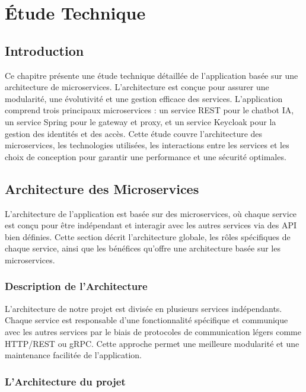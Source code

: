 \documentclass[a4paper, 11pt, openany]{report}
\begin{document}
\chapter{Étude Technique}

\section{Introduction}
Ce chapitre présente une étude technique détaillée de l'application basée sur une architecture de microservices. L'architecture est conçue pour assurer une modularité, une évolutivité et une gestion efficace des services. L'application comprend trois principaux microservices : un service REST pour le chatbot IA, un service Spring pour le gateway et proxy, et un service Keycloak pour la gestion des identités et des accès. Cette étude couvre l'architecture des microservices, les technologies utilisées, les interactions entre les services et les choix de conception pour garantir une performance et une sécurité optimales.

\section{Architecture des Microservices}

L'architecture de l'application est basée sur des microservices, où chaque service est conçu pour être indépendant et interagir avec les autres services via des API bien définies. Cette section décrit l'architecture globale, les rôles spécifiques de chaque service, ainsi que les bénéfices qu'offre une architecture basée sur les microservices.

\subsection{Description de l'Architecture}

L'architecture de notre projet est divisée en plusieurs services indépendants. Chaque service est responsable d'une fonctionnalité spécifique et communique avec les autres services par le biais de protocoles de communication légers comme HTTP/REST ou gRPC. Cette approche permet une meilleure modularité et une maintenance facilitée de l'application.




\newpage



\subsection{L'Architecture du projet}
\end{document}
